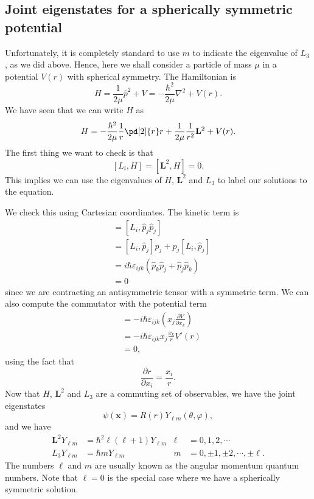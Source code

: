 \documentclass[a4paper]{article}
\begin{document}
\subsection{Joint eigenstates for a spherically symmetric potential}
Unfortunately, it is completely standard to use $m$ to indicate the eigenvalue of $L_3$, as we did above. Hence, here we shall consider a particle of mass $\mu$ in a potential $V(r)$ with spherical symmetry. The Hamiltonian is
\[
  H = \frac{1}{2\mu}\hat{p}^2 + V = -\frac{\hbar^2}{2\mu} \nabla^2 + V(r).
\]
We have seen that we can write $H$ as
\[
  H = -\frac{\hbar^2}{2\mu}\frac{1}{r}\pd[2]{r} r + \frac{1}{2 \mu} \frac{1}{r^2} \mathbf{L}^2 + V(r).
\]
The first thing we want to check is that
\[
  [L_i, H] = [\mathbf{L}^2, H] = 0.
\]
This implies we can use the eigenvalues of $H$, $\mathbf{L}^2$ and $L_3$ to label our solutions to the equation.

We check this using Cartesian coordinates. The kinetic term is
\begin{align*}
  [L_i, \hat{\mathbf{p}}^2]&= [L_i, \hat{p}_j \hat{p}_j]\\
  &= [L_i, \hat{p}_j] \hat{p}_j + \hat{p}_j [L_i, \hat{p}_j]\\
  &= i\hbar \varepsilon_{ijk} (\hat{p}_k\hat{p}_j + \hat{p}_j \hat{p}_k)\\
  &= 0
\end{align*}
since we are contracting an antisymmetric tensor with a symmetric term. We can also compute the commutator with the potential term
\begin{align*}
  [L_i, V(r)] &= -i\hbar \varepsilon_{ijk}\left(x_j \frac{\partial V}{\partial x_k}\right)\\
  &= -i\hbar \varepsilon_{ijk} x_j \frac{x_k}{r} V'(r)\\
  &= 0,
\end{align*}
using the fact that
\[
  \frac{\partial r}{\partial x_i} = \frac{x_i}{r}.
\]
Now that $H$, $\mathbf{L}^2$ and $L_3$ are a commuting set of observables, we have the joint eigenstates
\[
  \psi(\mathbf{x}) = R(r) Y_{\ell m} (\theta, \varphi),
\]
and we have
\begin{align*}
  \mathbf{L}^2 Y_{\ell m} &= \hbar^2 \ell (\ell + 1) Y_{\ell m} & \ell &= 0, 1, 2, \cdots\\
  L_3 Y_{\ell m} &= \hbar m Y_{\ell m} & m &= 0, \pm 1, \pm 2, \cdots, \pm \ell.
\end{align*}
The numbers $\ell$ and $m$ are usually known as the angular momentum quantum numbers. Note that $\ell = 0$ is the special case where we have a spherically symmetric solution.
\end{document}
